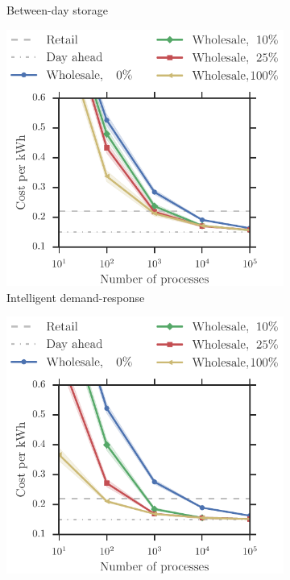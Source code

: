\documentclass[conference]{IEEEtran}
\begin{document}
\begin{figure}[t!]
\begin{subfigure}[b]{0.32\textwidth}
        \caption{Between-day storage}
        \label{fig:wholesale}
    \end{subfigure}
   	\begin{subfigure}[b]{0.32\textwidth}
	\includegraphics[width=1.0\textwidth, clip=true, trim=0 0 0 2cm]{figures/Wholesale_flex.pdf}
        \caption{Intelligent demand-response}
       \label{fig:wholesale_flex}
    \end{subfigure}
    \begin{subfigure}[b]{0.32\textwidth}
        \includegraphics[width=1.0\textwidth, clip=true, trim=0 0 0 2cm]{figures/Wholesale_betweenDay.pdf}

\end{subfigure}
\end{figure}
\end{document}
